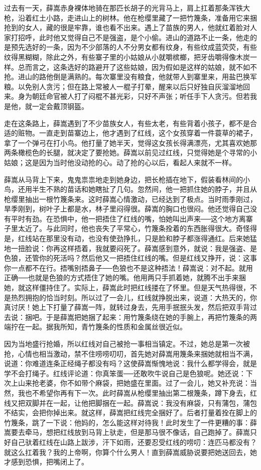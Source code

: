 过去有一天，薛嵩赤身裸体地骑在那匹长胡子的光背马上，肩上扛着那条浑铁大枪，沿着红土小路，走进山上的树林。他在枪缨里藏了一把竹篾条，准备用它来捆抢到的女人，藏的很是牢靠，谁也看不出来。遇上了苗族的男人，他就红着脸对人家打招呼，此时他又觉得自己不是强盗，是个小偷。进山的道路不止一条，他走的是预先选好的一条，因为不少部落的人不分男女都有纹身，有些纹成蓝荧荧，有些纹得黑糊糊，除此之外，有些寨子里的小姑娘从小就嚼槟榔，把牙齿嚼得像木炭一样。总而言之，这条选好的路避开了这些姑娘，因为假如是这样的姑娘，就不如不抢。进山的路他倒是满熟的。每次寨里没有粮食，他就带人到寨里来，用盐巴换军粮。以免别人贪污；但在路上常被人一棍子打晕，醒来以后只好独自灰溜溜地回来。身为朝廷命官被人打了闷棍不甚光彩，只好不声张；听任手下人贪污。但若我是他，就一定会戴顶钢盔。 

走在这条路上，薛嵩遇到了不少苗族女人，有些太老，有些背着小孩子，都不是合适的赃物。一直走到苗寨边上，他才遇到了红线，这个女孩穿着一件蓑草的裙子，拿了一个弹弓在打小鸟。他打量了她半天，觉得这女孩长得满漂亮，尤其喜欢她那两条橄榄色的长腿，就决定了要抢她。薛嵩以前见过红线，只觉得她是个寻常的小姑娘；这是因为当时他没动抢的心。动了抢的心以后，看起人来就不一样。 

薛嵩从马背上下来，鬼鬼祟祟地走到她身边，把长枪插在地下，假装看林间的小鸟，还用半生不熟的苗话和她瞎扯了几句。忽然间，他一把抓住她的脖子，并且从枪缨里抽出一根竹篾条来。这时薛嵩心情激动，已经达到了极点。当时雨季刚过，旱季刚到，树叶子上都是水，林子里闷得很。薛嵩的胸口也很闷。他还觉得自己没有平时有劲。在恐惧中，他一把捂住了红线的嘴，怕她叫出声来──这个地方离寨子里太近了。与此同时，他也丧失了平常心，竹篾条拴着的东西胀得很大。奇怪得是，红线站在那里没有动，也没有使劲挣扎，只是脸和脖子都涨得通红。后来她猛地一扭脸说：你再这样捂着，我就要闷死了。薛嵩感到意外，就说：我是强盗、是色狼，还管你的死活吗？然后他又一把捂住红线的嘴。但是红线又挣开，说：这事你一点都不在行。捂嘴别捂鼻子──色狼也不是这种捂法！薛嵩说：对不起。就用正确──也就是色狼的方式捂住了她的嘴。他用两只手抓着她，就腾不出手来捆她，就这样僵持住了。实际上，薛嵩此时把红线搂在了怀里。但是天气热得很，不是热烈拥抱的恰当时刻。所以过了一会儿，红线就挣脱出来，说道：大热天的，你真讨厌！她上下打量了薛嵩一阵，就转过身去，先用手抿抿头发，然后把双手背过去说：捆吧。于是薛嵩把她捆了起来：用竹篾条绕在她的手腕上，再把竹篾条的两端拧在一起。据我所知，青竹篾条的性质和金属丝很近似。 

因为当地盛行抢婚，所以红线对自己被抢一事相当镇定。不过，她总是第一次被抢，心情也相当激动，禁不住唠唠叨叨，首先她对薛嵩用篾条来捆她就相当不满，说道：你难道连条正经绳子都没有吗？这使薛嵩惭愧地说：我什么都学得会，就是学不会打绳子。红线评论道：你真笨蛋──还敢吹牛说自己是色狼呢。她还说：下次上山来抢老婆，你不如带个麻袋，把她盛在里面。过了一会儿，她又补充说：当然，我也不希望你再有下一次。此时薛嵩从枪缨里抽出第二根篾条，蹲下身去，红线又把双脚并在一起，让他把脚捆在一起。薛嵩说：我没有麻袋，只有蒲包，蒲包不结实，会把你掉出来。就这样，薛嵩把红线完全捆好了。后者打量着拴在脚上的竹篾条，跳了一下说：他妈的，怎么能这样对待我！此时发生了一件更糟的事：薛嵩要去牵马，想把红线放到马背上驮走，但是那马很不像话，自己跑掉了。薛嵩只好自己驮着红线在山路上跋涉，汗下如雨，还要忍受红线的唠叨：连匹马都没有？就这么扛着我？我的上帝啊，你算个什么男人！直到薛嵩威胁说要把她送回去，她才感到恐惧，把嘴闭上了。 

